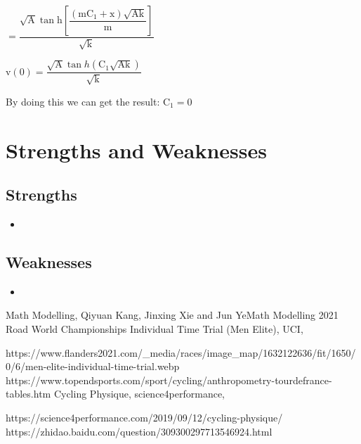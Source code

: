 \documentclass[14pt]{article}
\begin{document}
	$=\dfrac{\sqrt{\mathrm{A}} \tan \mathrm{h}\left[\dfrac{\left(\mathrm{m}\mathrm{C}_1+\mathrm{x}\right)\sqrt{\mathrm{Ak}}}{\mathrm{m}}\right]}{\sqrt{\mathrm{k}}}$

	$\mathrm{v}(0)=\dfrac{\sqrt{\mathrm{A}} \tan h \left(\mathrm{C}_1\sqrt{\mathrm{Ak}}\right)}{\sqrt{\mathrm{k}}}$

	By doing this we can get the result: $\mathrm{C}_1=0$
	\section{Strengths and Weaknesses}
	\subsection*{Strengths}
	\begin{itemize}
		\item
	\end{itemize}
	\subsection*{Weaknesses}
	\begin{itemize}
		\item 
	\end{itemize}
	\newpage
	\thispagestyle{empty}
	\renewcommand\refname{References}
	\clearpage
	\begin{thebibliography}{100}
		 Math Modelling, Qiyuan Kang, Jinxing Xie and Jun YeMath Modelling
		2021 Road World Championships Individual Time Trial (Men Elite), UCI,
		
		https://www.flanders2021.com/\_media/races/image\_map/1632122636/fit/1650/0/6/men-elite-individual-time-trial.webp
		https://www.topendsports.com/sport/cycling/anthropometry-tourdefrance-tables.htm
		Cycling Physique, science4performance,
		
		https://science4performance.com/2019/09/12/cycling-physique/
		https://zhidao.baidu.com/question/309300297713546924.html
	\end{thebibliography} 
	
\end{document}
